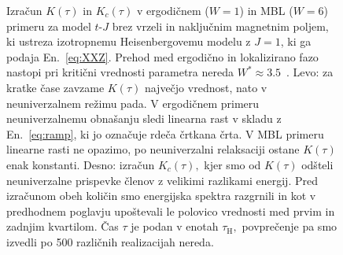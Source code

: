  \begin{figure}[H]
\caption{Izračun $K(\tau)$ in $K_c(\tau)$ v ergodičnem ($W=1$) in MBL ($W=6$) primeru za model $t$-$J$ brez vrzeli in naključnim magnetnim poljem, ki ustreza izotropnemu Heisenbergovemu modelu z $J=1$, ki ga podaja En.~\eqref{eq:XXZ}. Prehod med ergodično in lokalizirano fazo nastopi pri kritični vrednosti parametra nereda $W^*\approx 3.5$~\cite{pal2010many}. Levo: za kratke čase zavzame $K(\tau)$ največjo vrednost, nato v neuniverzalnem režimu pada. V ergodičnem primeru neuniverzalnemu obnašanju sledi linearna rast v skladu z En.~\eqref{eq:ramp}, ki jo označuje rdeča črtkana črta. V MBL primeru linearne rasti ne opazimo, po neuniverzalni relaksaciji ostane $K(\tau)$ enak konstanti. 
Desno: izračun $K_c(\tau),$ kjer smo od $K(\tau)$ odšteli neuniverzalne prispevke členov z velikimi razlikami energij. 
Pred izračunom obeh količin smo energijska spektra razgrnili in kot v predhodnem poglavju upoštevali le polovico vrednosti med prvim in zadnjim kvartilom. Čas $\tau$ je podan v enotah $\tau_\mathrm{H},$ povprečenje pa smo izvedli po 500 različnih realizacijah nereda. }
\label{fig:scheme_sff_disorder_14_0_7}
\end{figure}  
\newpage

